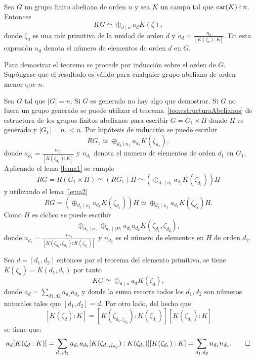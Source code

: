 \begin{teorema}\label{teo:Perlis-Walker}
Sea $G$ un grupo finito abeliano de orden $n$ y sea $K$ un campo tal que $\operatorname{car}(K)\nmid n$. Entonces
\[  KG \simeq \oplus_{d\mid n}a_dK(\zeta), \]
donde $\zeta_d$ es una raíz primitiva de la unidad de orden $d$ y $a_d = \frac{n_d}{[K(\zeta_d):K]}$. En esta expresión $n_d$ denota el número de elementos de orden $d$ en $G$.
\end{teorema} 
\begin{proof*}
Para demostrar el teorema se procede por inducción sobre el orden de $G$. Supóngase que el resultado es válido para cualquier grupo abeliano de orden menor que $n$. 

Sea $G$ tal que $|G| = n$. Si $G$ es generado no hay algo que demostrar. Si $G$ no fuera un grupo generado se puede utilizar el teorema~\ref{teo:estructuraAbelianos} de estructura de los grupos finitos abelianos para escribir $G = G_1 \times H$ donde $H$ es generado y $|G_1| = n_1 < n$. Por hipótesis de inducción se puede escribir 
\[ RG_1 \simeq \oplus_{d_1\mid n_1} a_{d_1}K(\zeta_{d_1}),\]
donde $a_{d_1} =\frac{n_{d_1}}{[K(\zeta_{d_1}):K]}$ y $n_{d_1}$ denota el numero de elementos de orden $d_1$ en $G_1$. Aplicando el lema \ref{lema1} se cumple
\[  RG = R(G_1 \times H) \simeq (RG_1)H \simeq \left(\oplus_{d_1\mid n_1}a_{d_1}K(\zeta_{d_1})\right) H \]
y utilizando el lema \ref{lema2}
\[RG = \left( \oplus_{d_1\mid n_1}a_{d_1}K(\zeta_{d_1}) \right)H \simeq \oplus_{d_1 \mid n_1} a_{d_1}K(\zeta_{d_1})H.\]
Como $H$ es cíclico se puede escribir
\[ \oplus_{d_1\mid n_1}\oplus_{d_2\mid |H|}a_{d_1}a_{d_2}K(\zeta_{d_1}, \zeta_{d_2}),\]
donde $a_{d_2} = \frac{n_{d_2}}{[K(\zeta_{d_1}, \zeta_{d_2} ): K(\zeta_{d_1})]}$ y $n_{d_2}$ es el número de elementos en $H$ de orden $d_2$.

Sea $d = [d_1, d_2]$ entonces por el teorema del elemento primitivo, se tiene $K(\zeta_d) = K(d_1,d_2)$ por tanto 
\[ KG \simeq \oplus_{d\mid n}a_dK(\zeta_d),\]
donde $a_d = \sum_{d1,d2}a_{d_1}a_{d_2}$ y donde la  suma recorre todos los $d_1,d_2$ son números naturales tales que $[d_1,d_2] = d$. Por otro lado, del hecho que \[[K(\zeta_d):K] = [K(\zeta_{d_1, \zeta_{d_2}}): K(\zeta_{d_1})][K(\zeta_{d_1}):K]\]  se tiene que: 
\[ a_d[K(\zeta_{d} :K)] = \sum_{d_1,d_2}a_{d_1}a_{d_2}[K(\zeta_{d_1, \zeta_{d_2}}): K(\zeta_{d_1})][K(\zeta_{d_1}):K] = \sum_{d_1,d_2}n_{d_1}n_{d_2}.\qedhere\]
\end{proof*}